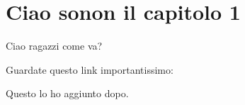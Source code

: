 \chapter{Ciao sonon il capitolo 1}

Ciao ragazzi come va?

Guardate questo link importantissimo: \cite{provaBibliografia}


Questo lo ho aggiunto dopo.